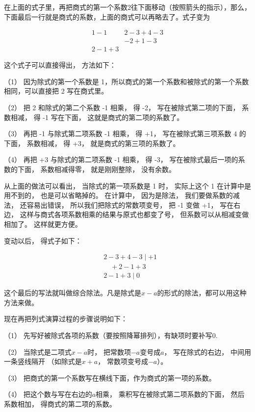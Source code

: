 在上面的式子里，再把商式的第一个系数2往下面移动（按照箭头的指示），那么，下面最后一行就是商式的系数，上面的商式可以再略去了。式子变为

\[
\begin{array}{rl} 1 - 1 & 2 - 3 + 4 - 3 \\ & - 2 + 1 - 3 \\ \hline 2 - 1 + 3 \end{array}
\]

这个式子可以直接得出， 方法如下：

（1） 因为除式的第一个系数是
1，所以商式的第一个系数和被除式的第一个系数相同，可以直接把 2
写在商式里。

（2） 把 2 和除式的第二个系数 -1 相乘， 得 -2， 写在被除式第二项的下面，
系数相减， 得 -1 写在下面， 这就是商式的第二项的系数了。

（3） 再把 -1 与除式第二项系数 -1 相乘， 得 +1， 写在被除式第三项系数 4
的下面， 系数相减， 得 +3， 就是商式的第三项的系数了。

（4） 再把 +3 与除式的第二项系数 -1 相乘， 得 -3，
写在被除式最后一项的系数的下面， 系数相减得零， 就是刚刚整除，
没有余数。

从上面的做法可以看出， 当除式的第一项系数是 1 时， 实际上这个 1
在计算中是用不到的， 也是可以省略掉的。 在计算中， 因为是除法，
我们要做系数的减法， 还容易出错误， 所以我们把除式的常数项变号， 把 -1
变做 +1， 写在右边， 这样与商式各项系数相乘的结果与原式也都变了号，
但系数可以从相减变做相加了。 这样就更方便。

变动以后， 得式子如下：

\[
\begin{array}{rl} & 2 - 3 + 4 - 3 \mid + 1 \\ & \quad + 2 - 1 + 3 \\ \hline {} & 2 - 1 + 3 \mid 0 \end{array}
\]

这个最后的写法就叫做综合除法。凡是除式是\(x - a\)的形式的除法，都可以用这种方法来做。

现在再把列式演算过程的步骤说明如下：

（1） 先写好被除式各项的系数（要按照降幂排列），有缺项时要补写0.

（2） 当除式是二项式\(x - a\)时， 把常数项\(-a\)变号成\(a\)，
写在除式的右边， 中间用一条竖线隔开 （如除式是\(x + a\)，
常数项变号成\(-a\)）。

（3） 把商式的第一个系数写在横线下面，作为商式的第一项的系数。

（4） 把这个数与写在右边的\(a\)相乘， 乘积写在被除式第二项系数的下面，
然后系数相加， 得商式的第二项的系数。

